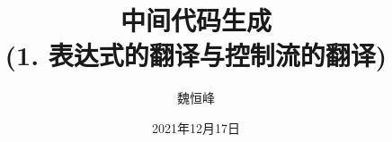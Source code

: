 \documentclass[]{beamer}
\title[语义分析]{中间代码生成 \\ (1. 表达式的翻译与控制流的翻译)}
\author[魏恒峰]{\large 魏恒峰}
\institute{hfwei@nju.edu.cn}
\date{2021年12月17日}
\begin{document}
\maketitle







\thankyou{}

\end{document}
